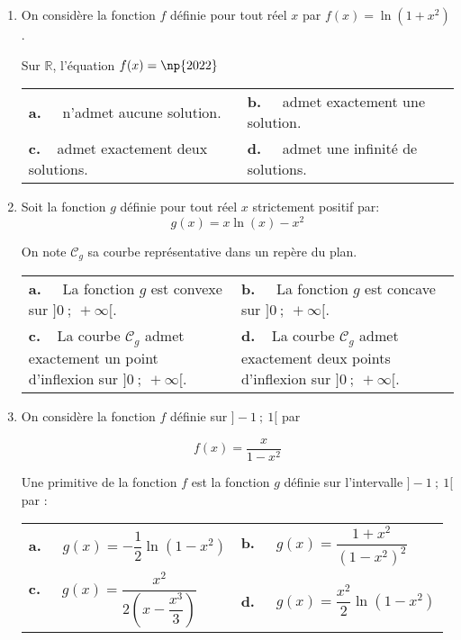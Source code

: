 \documentclass[11pt,a4paper,french]{article}
\newcommand{\R}{\mathbb{R}}
\begin{document}
\begin{enumerate}
\item On considère la fonction $f$ définie pour tout réel $x$ par $f(x) = \ln \left(1  + x^2\right)$. 

Sur $\R$, l'équation $f(x) = \np{2022}$

\begin{center}
\begin{tabularx}{\linewidth}{*{2}{X}}
\textbf{a.~~} n'admet aucune solution. &\textbf{b.~~} admet exactement une solution.\\
\textbf{c.~~}admet exactement deux solutions.&\textbf{d.~~} admet une infinité de solutions.
\end{tabularx}
\end{center}

\item Soit la fonction $g$ définie pour tout réel $x$ strictement positif par: 
\[g(x) = x \ln (x) - x^2\]

On note $\mathcal{C}_g$ sa courbe représentative dans un repère du plan.

\begin{center}
\begin{tabularx}{\linewidth}{*{2}{X}}
\textbf{a.~~} La fonction $g$ est convexe sur $]0~;~+\infty[$.&\textbf{b.~~} La fonction $g$ est concave sur $]0~;~+\infty[$.\\
\textbf{c.~~}La courbe $\mathcal{C}_g$ admet exactement un point d'inflexion sur $]0~;~+\infty[$.&\textbf{d.~~}La courbe $\mathcal{C}_g$ admet exactement
deux points d'inflexion sur $]0~;~+\infty[$.
\end{tabularx}
\end{center}

\item On considère la fonction $f$ définie sur $]- 1~;~1[$ par

\[f(x) = \dfrac{x}{1 - x^2}\]

Une primitive de la fonction $f$ est la fonction $g$ définie sur l'intervalle $] - 1~;~1[$ par :

\begin{center}
\begin{tabularx}{\linewidth}{*{2}{X}}
\textbf{a.~~} $g(x) = - \dfrac12 \ln \left(1 - x^2\right)$&\textbf{b.~~} $g(x) =  \dfrac{1 + x^2}{ \left(1 - x^2\right)^2}$\\
\textbf{c.~~} $g(x)= \dfrac{x^2}{2\left(x - \dfrac{x^3}{3}\right)}$&\textbf{d.~~} $g(x) = \dfrac{x^2}{2}\ln \left(1 - x^2\right)$
\end{tabularx}
\end{center}


\end{enumerate}
\end{document}
